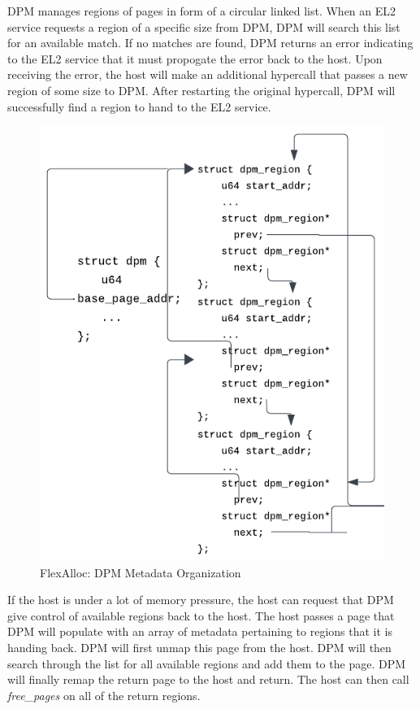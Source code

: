 DPM manages regions of pages in form of a circular linked list. When an EL2 service requests
a region of a specific size from DPM, DPM will search this list for an available match.
If no matches are found, DPM returns an error indicating to the EL2 service that it must
propogate the error back to the host. Upon receiving the error, the host will make an
additional hypercall that passes a new region of some size to DPM. After restarting the original
hypercall, DPM will successfully find a region to hand to the EL2 service.

\begin{figure}[h!tbp]
\centering
\captionsetup{justification=centering}
\includegraphics{dpmmetadata}
\caption{FlexAlloc: DPM Metadata Organization}
\label{fig:dpmmetadata}
\end{figure}

If the host is under a lot of memory pressure, the host can request that DPM give control
of available regions back to the host. The host passes a page that DPM will populate with
an array of metadata pertaining to regions that it is handing back. DPM will first unmap this
page from the host. DPM will then search through the list for all available regions and add them
to the page. DPM will finally remap the return page to the host and return. The host can then
call \textit{free\_pages} on all of the return regions.

